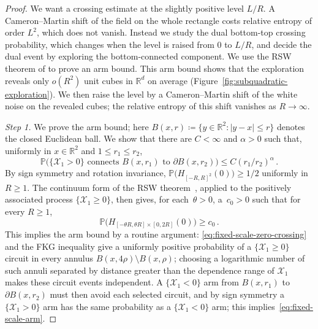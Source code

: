 \documentclass[11pt]{amsart}
\theoremstyle{plain}
\theoremstyle{definition}
\newcommand{\R}{\mathbb{R}}
\renewcommand{\P}{\mathbb{P}}
\begin{document}
\begin{proof}
We want a crossing estimate at the slightly positive level $L/R$. A
Cameron--Martin shift of the field on the whole rectangle costs relative
entropy of order $L^2$, which does not vanish. Instead we study the dual
bottom-top crossing probability, which changes when the level is raised from
$0$ to $L/R$, and decide the dual event by exploring the bottom-connected
component. We use the RSW theorem of
\citet[Theorem~1]{KohlerSchindlerTassion} to prove an arm bound. This arm bound shows that the
exploration reveals only $o(R^2)$ unit cubes in $\R^d$ on average
(Figure~\ref{fig:subquadratic-exploration}). We then raise the level by a
Cameron--Martin shift of the white noise on the revealed cubes; the relative
entropy of this
shift vanishes as $R\to\infty$.

\smallskip
\noindent\emph{Step 1.}  We prove the arm bound; here
$B(x,r)\coloneqq\{y\in\R^2:|y-x|\leq r\}$ denotes the closed Euclidean
ball. We show that there are $C<\infty$
and $\alpha>0$ such that, uniformly in $x\in\R^2$ and $1\leq r_1\leq r_2$,
\begin{equation}\label{eq:fixed-scale-arm}
    \P\bigl(\{\mathcal X_1>0\}\text{ connects }B(x,r_1)\text{ to }\partial B(x,r_2)\bigr)
    \leq C(r_1/r_2)^\alpha\, .
\end{equation}
By sign symmetry and rotation invariance, $\P\bigl(H_{[-R,R]^2}(0)\bigr)\geq1/2$ uniformly in~$R \geq 1$.
The continuum form of the RSW theorem~\citep[Theorem~1 and Comment~1]{KohlerSchindlerTassion}, applied to the positively
associated process $\{\mathcal X_1\geq0\}$, then gives, for each~$\theta > 0$, a~$c_0 > 0$ such that for every $R\geq 1$,
\begin{equation}\label{eq:fixed-scale-zero-crossing}
    \P\bigl(H_{[-\theta R,\theta R]\times[0,2R]}(0)\bigr)
    \geq c_0\, .
\end{equation}
This implies the arm bound by a routine argument: \eqref{eq:fixed-scale-zero-crossing} and the FKG inequality give a
uniformly positive probability of a $\{\mathcal X_1\geq0\}$ circuit in every annulus
$B(x,4\rho)\setminus B(x,\rho)$; choosing a logarithmic number of such annuli
separated by distance greater than the dependence range of $\mathcal X_1$ makes these circuit
events independent. A $\{\mathcal X_1<0\}$ arm from $B(x,r_1)$ to $\partial B(x,r_2)$ must
then avoid each selected circuit, and by sign symmetry a $\{\mathcal X_1>0\}$ arm
has the same probability as a $\{\mathcal X_1<0\}$ arm; this
implies~\eqref{eq:fixed-scale-arm}. 


\end{proof}
\end{document}
